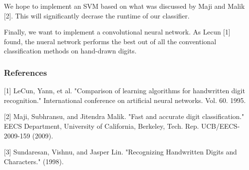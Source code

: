 \documentclass{article} %
\begin{document}
We hope to implement an SVM based on what was discussed by Maji and Malik [2].
This will significantly decrase the runtime of our classifier.

Finally, we want to implement a convolutional neural network. As Lecun [1] found,
the nueral network performs the best out of all the conventional classification
methods on hand-drawn digits.


\subsubsection*{References}

\small{
  [1] LeCun, Yann, et al. "Comparison of learning algorithms for handwritten
  digit recognition." International conference on artificial neural networks.
  Vol. 60. 1995.	

  [2] Maji, Subhransu, and Jitendra Malik. "Fast and accurate digit
  classification." EECS Department, University of California,
  Berkeley, Tech. Rep. UCB/EECS-2009-159 (2009).

  [3] Sundaresan, Vishnu, and Jasper Lin. "Recognizing Handwritten Digits and
  Characters." (1998).
}
\end{document}
